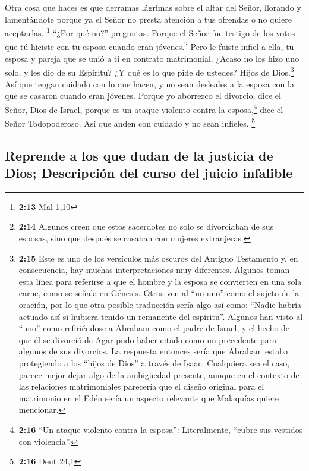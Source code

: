  Otra cosa que haces es que derramas lágrimas sobre el
altar del Señor, llorando y lamentándote porque ya el Señor no presta
atención a tus ofrendas o no quiere aceptarlas. \footnote{\textbf{2:13}
  Mal 1,10}  ``¿Por qué no?'' preguntas. Porque el Señor
fue testigo de los votos que tú hiciste con tu esposa cuando eran
jóvenes.\footnote{\textbf{2:14} Algunos creen que estos sacerdotes no
  solo se divorciaban de sus esposas, sino que después se casaban con
  mujeres extranjeras.} Pero le fuiste infiel a ella, tu esposa y pareja
que se unió a ti en contrato matrimonial.  ¿Acaso no los
hizo uno solo, y les dio de su Espíritu? ¿Y qué es lo que pide de
ustedes? Hijos de Dios.\footnote{\textbf{2:15} Este es uno de los
  versículos más oscuros del Antiguo Testamento y, en consecuencia, hay
  muchas interpretaciones muy diferentes. Algunos toman esta línea para
  referirse a que el hombre y la esposa se convierten en una sola carne,
  como se señala en Génesis. Otros ven al ``no uno'' como el sujeto de
  la oración, por lo que otra posible traducción sería algo así como:
  ``Nadie habría actuado así si hubiera tenido un remanente del
  espíritu''. Algunos han visto al ``uno'' como refiriéndose a Abraham
  como el padre de Israel, y el hecho de que él se divorció de Agar pudo
  haber citado como un precedente para algunos de sus divorcios. La
  respuesta entonces sería que Abraham estaba protegiendo a los ``hijos
  de Dios'' a través de Isaac. Cualquiera sea el caso, parece mejor
  dejar algo de la ambigüedad presente, aunque en el contexto de las
  relaciones matrimoniales parecería que el diseño original para el
  matrimonio en el Edén sería un aspecto relevante que Malaquías quiere
  mencionar.} Así que tengan cuidado con lo que hacen, y no sean
desleales a la esposa con la que se casaron cuando eran jóvenes.
 Porque yo aborrezco el divorcio, dice el Señor, Dios de
Israel, porque es un ataque violento contra la esposa,\footnote{\textbf{2:16}
  ``Un ataque violento contra la esposa'': Literalmente, ``cubre sus
  vestidos con violencia''.} dice el Señor Todopoderoso. Así que anden
con cuidado y no sean infieles. \footnote{\textbf{2:16} Deut 24,1}

\hypertarget{reprende-a-los-que-dudan-de-la-justicia-de-dios-descripciuxf3n-del-curso-del-juicio-infalible}{%
\subsection{Reprende a los que dudan de la justicia de Dios; Descripción
del curso del juicio
infalible}\label{reprende-a-los-que-dudan-de-la-justicia-de-dios-descripciuxf3n-del-curso-del-juicio-infalible}}

